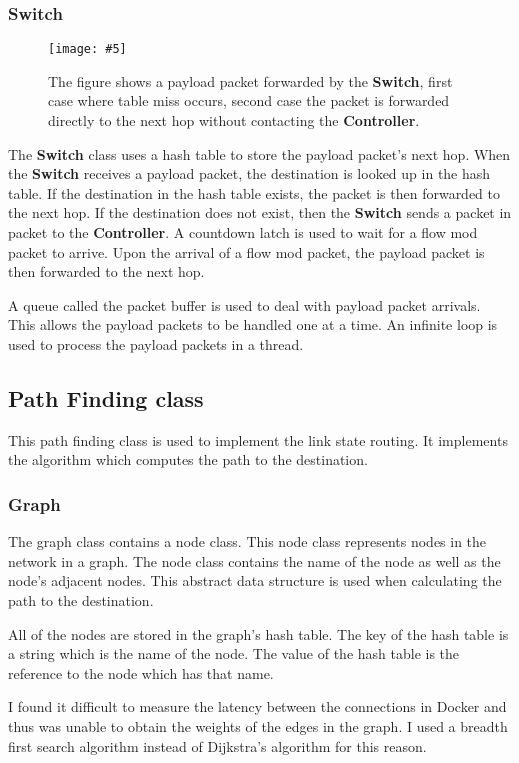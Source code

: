 \documentclass{article}
\newcommand{\includescalefigure}[5]{
  \begin{figure}[H]
    \centering
    \texttt{[image: \#5]}
    \captionsetup{width=.8\linewidth}
    \caption[#2]{#3}
    \label{#1}
  \end{figure}
}
\begin{document}
\subsubsection{Switch}

\includescalefigure{RouterForward}{Router forwarding messages}{The figure shows
a payload packet forwarded by the \textbf{Switch}, first case where table miss
occurs, second case the packet is forwarded directly to the next hop without
contacting the \textbf{Controller}.}{1}{RouterForward.png}

The \textbf{Switch} class uses a hash table to store the payload packet's next
hop. When the \textbf{Switch} receives a payload packet, the destination is
looked up in the hash table. If the destination in the hash table exists, the
packet is then forwarded to the next hop. If the destination does not exist,
then the \textbf{Switch} sends a packet in packet to the \textbf{Controller}.
A countdown latch is used to wait for a flow mod packet to arrive. Upon the
arrival of a flow mod packet, the payload packet is then forwarded to the
next hop.

A queue called the packet buffer is used to deal with payload packet arrivals.
This allows the payload packets to be handled one at a time.  An infinite loop
is used to process the payload packets in a thread.

\subsection{Path Finding class}
This path finding class is used to implement the link state routing. It
implements the algorithm which computes the path to the destination.

\subsubsection{Graph}
The graph class contains a node class. This node class represents nodes in the
network in a graph. The node class contains the name of the node as well as the
node's adjacent nodes. This abstract data structure is used when calculating the
path to the destination.

All of the nodes are stored in the graph's hash table. The key of the hash
table is a string which is the name of the node. The value of the hash table is
the reference to the node which has that name.

I found it difficult to measure the latency between the connections in Docker
and thus was unable to obtain the weights of the edges in the graph. I used a
breadth first search algorithm instead of Dijkstra's algorithm for this reason.
\end{document}
